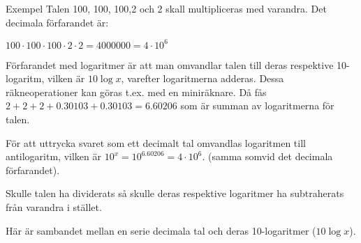 Exempel
Talen 100, 100, 100,2 och 2 skall multipliceras med varandra.
Det decimala förfarandet är:

$100 \cdot 100 \cdot 100 \cdot 2 \cdot 2 = 4000000 = 4 \cdot 10^6$

Förfarandet med logaritmer är att man omvandlar talen till deras respektive
10-logaritm, vilken är $10\log x$, varefter logaritmerna adderas. Dessa
räkneoperationer kan göras t.ex. med en miniräknare. Då fås
$2 + 2 + 2 + 0.30103 + 0.30103 = 6.60206$ som är summan av logaritmerna för
talen.

För att uttrycka svaret som ett decimalt tal omvandlas logaritmen till
antilogaritm, vilken är $10^x = 10^{6.60206} = 4 \cdot 10^6$.
(samma somvid det decimala förfarandet).

Skulle talen ha dividerats så skulle deras respektive logaritmer ha subtraherats
från varandra i stället.

Här är sambandet mellan en serie decimala tal och deras 10-logaritmer ($10\log x$).

